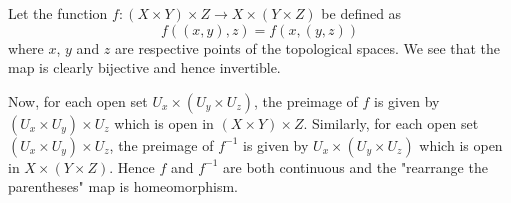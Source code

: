 
\begin{solution}
    Let the function $f:(X\times Y)\times Z \to 
X\times(Y\times Z)$ be defined as
$$f((x,y),z)=f(x,(y,z))$$
where $x$, $y$ and $z$ are respective points of
the topological spaces. We see that the map is
clearly bijective and hence invertible.

\vspace*{2mm}
Now, for each open set $U_x\times (U_y\times U_z)$,
the preimage of $f$
is given by $(U_x\times U_y)\times U_z$
which is open in $(X\times Y)\times Z$. Similarly,
for each open set $(U_x\times U_y)\times U_z$,
the preimage of $f^{-1}$
is given by $U_x\times (U_y\times U_z)$
which is open in $X\times (Y\times Z)$.
Hence $f$ and $f^{-1}$ are both continuous and the
"rearrange the parentheses" map is homeomorphism.
\end{solution}